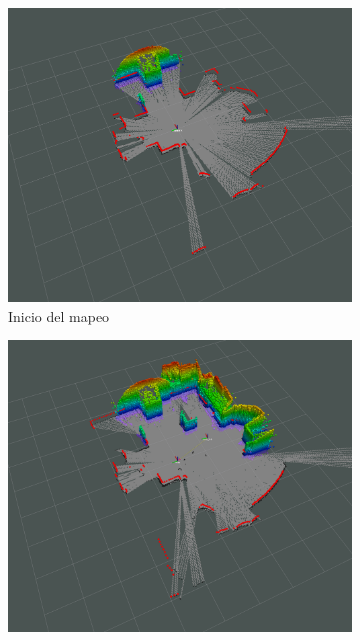 \begin{figure}[H]
    \centering
    \begin{subfigure}[b]{0.30\textwidth}
    \includegraphics[width=\textwidth, height=\textwidth]{figures/05experimentacion/ambiente_5/r04_01.png}
    \caption{Inicio del mapeo}
    \label{fig:ambiente_5_1}
    \end{subfigure}
    \begin{subfigure}[b]{0.30\textwidth}
    \includegraphics[width=\textwidth, height=\textwidth]{figures/05experimentacion/ambiente_5/r04_02.png}

\end{subfigure}
\end{figure}
